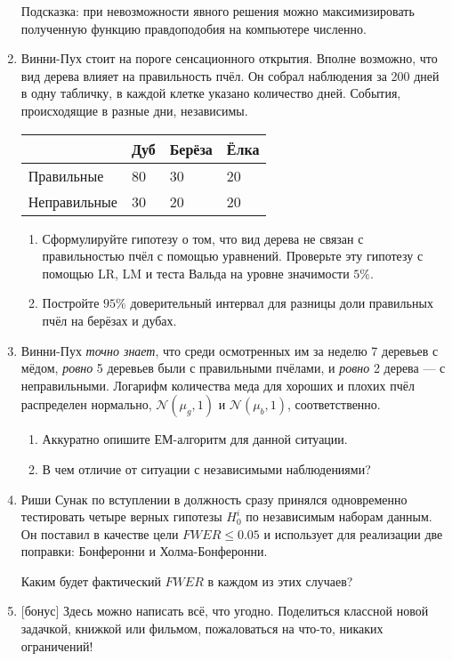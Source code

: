 \documentclass[12pt]{article}
\newcommand \cN{\mathcal{N}}
\begin{document}
\begin{enumerate}
Подсказка: при невозможности явного решения можно максимизировать полученную функцию правдоподобия на компьютере численно. 



\newpage


\item Винни-Пух стоит на пороге сенсационного открытия. Вполне возможно, что вид дерева влияет на правильность пчёл. 
Он собрал наблюдения за 200 дней в одну табличку, в каждой клетке указано количество дней. 
События, происходящие в разные дни, независимы. 


    \begin{tabular}{@{}llll@{}}
    \toprule
    & Дуб & Берёза & Ёлка \\ \midrule
    Правильные & 80 &  30  & 20\\
    Неправильные & 30  & 20 & 20 \\ \bottomrule
    \end{tabular}


\begin{enumerate}
    \item Сформулируйте гипотезу о том, что вид дерева не связан с правильностью пчёл с помощью уравнений. 
    Проверьте эту гипотезу с помощью LR, LM и теста Вальда на уровне значимости $5\%$.
    \item Постройте $95\%$ доверительный интервал для разницы доли правильных пчёл на берёзах и дубах. 
\end{enumerate}


\item Винни-Пух \textit{точно знает}, что среди осмотренных им за неделю 7 деревьев с мёдом, \textit{ровно} 5 деревьев были с правильными 
пчёлами, и \textit{ровно} 2 дерева — с неправильными. 
Логарифм количества меда для хороших и плохих пчёл распределен нормально, $\cN(\mu_g, 1)$ и $\cN(\mu_b, 1)$, соответственно. 

\begin{enumerate}
    \item Аккуратно опишите ЕМ-алгоритм для данной ситуации.
    \item В чем отличие от ситуации с независимыми наблюдениями?
\end{enumerate}



\item Риши Сунак по вступлении в должность сразу принялся одновременно тестировать четыре верных гипотезы $H_0^i$ по независимым наборам данным.
Он поставил в качестве цели $FWER \leq 0.05$ и использует для реализации две поправки: Бонферонни и Холма-Бонферонни. 

Каким будет фактический $FWER$ в каждом из этих случаев?

\item {[бонус]} Здесь можно написать всё, что угодно. 
Поделиться классной новой задачкой, книжкой или фильмом, пожаловаться на что-то, никаких ограничений!

\end{enumerate}
\end{document}
